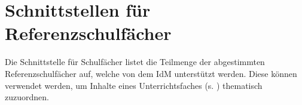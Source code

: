 \section{Schnittstellen für Referenzschulfächer}
Die Schnittstelle für Schulfächer listet die Teilmenge der abgestimmten Referenzschulfächer auf, welche von dem IdM unterstützt werden.
Diese können verwendet werden, um Inhalte eines Unterrichtsfaches (s. ) thematisch zuzuordnen.



%

%
%